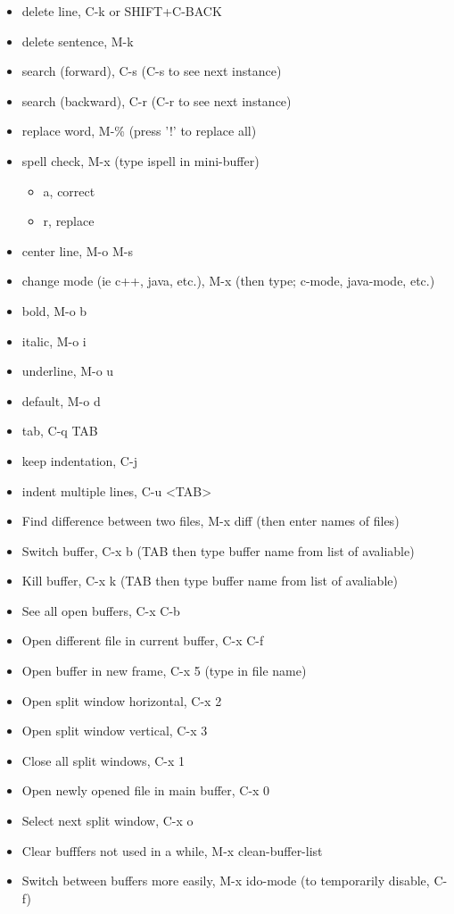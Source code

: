 \documentclass[11pt]{article}
\begin{document}
\begin{itemize}
\item delete line, C-k or SHIFT+C-BACK
\item delete sentence, M-k
\item search (forward), C-s (C-s to see next instance)
\item search (backward), C-r (C-r to see next instance)
\item replace word, M-\% (press '!' to replace all)
\item spell check, M-x (type ispell in mini-buffer)
\begin{itemize}
\item a, correct
\item r, replace
\end{itemize}
\item center line, M-o M-s
\item change mode (ie c++, java, etc.), M-x (then type; c-mode, java-mode, etc.)
\item bold, M-o b
\item italic, M-o i
\item underline, M-o u
\item default, M-o d
\item tab, C-q TAB
\item keep indentation, C-j
\item indent multiple lines, C-u <TAB>
\item Find difference between two files, M-x diff (then enter names of files)
\item Switch buffer, C-x b (TAB then type buffer name from list of avaliable)
\item Kill buffer, C-x k  (TAB then type buffer name from list of avaliable)
\item See all open buffers, C-x C-b
\item Open different file in current buffer, C-x C-f
\item Open buffer in new frame, C-x 5 (type in file name)
\item Open split window horizontal, C-x 2
\item Open split window vertical, C-x 3
\item Close all split windows, C-x 1
\item Open newly opened file in main buffer, C-x 0
\item Select next split window, C-x o
\item Clear bufffers not used in a while, M-x clean-buffer-list
\item Switch between buffers more easily, M-x ido-mode (to temporarily disable, C-f)

\end{itemize}
\end{document}
